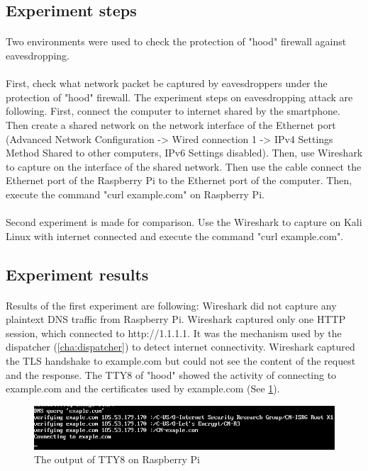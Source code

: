 \documentclass[mscthesis]{usiinfthesis}
\begin{document}
\subsection{Experiment steps}
\paragraph{}
Two environments were used to check the protection of "hood" firewall against eavesdropping.
\paragraph{}
First, check what network packet be captured by eavesdroppers under the protection of "hood" firewall. The experiment steps on eavesdropping attack are following. First, connect the computer to internet shared by the smartphone. Then create a shared network on the network interface of the Ethernet port (Advanced Network Configuration -> Wired connection 1 -> IPv4 Settings Method Shared to other computers, IPv6 Settings disabled). Then, use Wireshark to capture on the interface of the shared network. Then use the cable connect the Ethernet port of the Raspberry Pi to the Ethernet port of the computer. Then, execute the command "curl example.com" on Raspberry Pi.
\paragraph{}
Second experiment is made for comparison. Use the Wireshark to capture on Kali Linux with internet connected and execute the command "curl example.com".

\subsection{Experiment results}
\paragraph{}
Results of the first experiment are following: Wireshark did not capture any plaintext DNS traffic from Raspberry Pi. Wireshark captured only one HTTP session, which connected to http://1.1.1.1. It was the mechanism used by the dispatcher (\cref{cha:dispatcher}) to detect internet connectivity. Wireshark captured the TLS handshake to example.com but could not see the content of the request and the response. The TTY8 of "hood" showed the activity of connecting to example.com and the certificates used by example.com (See \cref{fig:hood-tty-output}).
\begin{figure}[H]
  \includegraphics[width=\textwidth]{penetration_test/hoodcurlexample_tty_output_cropped.png}
  \caption{The output of TTY8 on Raspberry Pi}
  \label{fig:hood-tty-output}
\end{figure}
\end{document}
